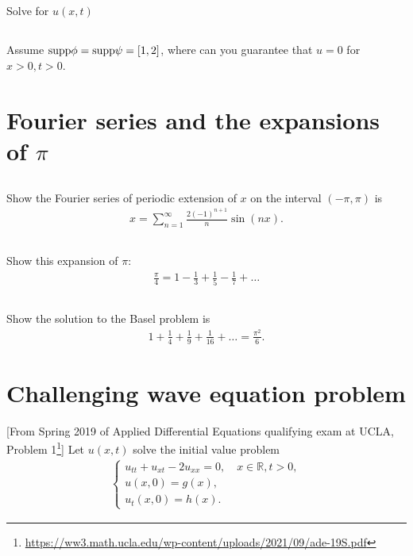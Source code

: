 \documentclass[11pt,letterpaper]{report}
\begin{document}
\subsection{}
Solve for $u(x,t)$

\subsection{}
Assume $\text{supp}\phi = \text{supp}\psi=[1,2]$, where can you guarantee that $u=0$ for $x>0, t>0$. 

\section{Fourier series and the expansions of $\pi$}
\subsection{}
Show the Fourier series of periodic extension of $x$ on the interval $(-\pi,\pi)$ is
\begin{align}
    x = \sum_{n=1}^\infty \frac{2(-1)^{n+1}}{n}\sin(nx).
\end{align}

\subsection{}
Show this expansion of $\pi$:
\begin{align}
    \frac{\pi}{4} = 1-\frac{1}{3}+\frac{1}{5}-\frac{1}{7}+\dots
\end{align}

\subsection{}
Show the solution to the Basel problem is
\begin{align}
    1+\frac{1}{4}+\frac{1}{9}+\frac{1}{16} + \dots = \frac{\pi^2}{6}.
\end{align}

\section{Challenging wave equation problem}
[From Spring 2019 of Applied Differential Equations qualifying exam at UCLA, Problem 1\footnote{\url{https://ww3.math.ucla.edu/wp-content/uploads/2021/09/ade-19S.pdf}}]  Let $u(x,t)$ solve the initial value problem
\begin{align}
    \begin{cases}
        u_{tt}+u_{xt}-2u_{xx} = 0,\quad x\in\mathbb{R}, t>0,\\
        u(x,0) = g(x),\\
        u_t(x,0) = h(x).
    \end{cases}
\end{align}
\end{document}
